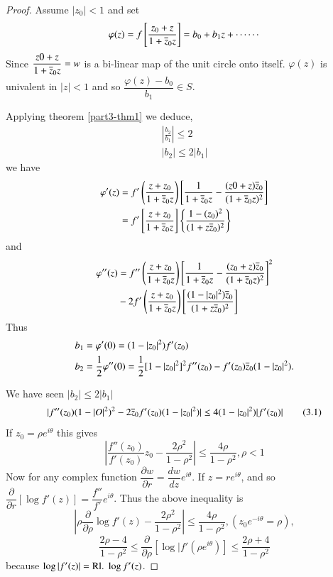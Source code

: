 \begin{proof}
Assume $|z_{0}|<1$ and set
$$
\varphi(z)=f\left[\frac{z_{0}+z}{1+\overline{z}_{0}z}\right]=b_{0}+b_{1}z+\cdots\cdots
$$
Since $\dfrac{z0+z}{1+\overline{z}_{0}z}=w$ is a bi-linear map of the unit
circle onto itself. $\varphi(z)$ is univalent in $|z|<1$ and so
$\dfrac{\varphi(z)-b_{0}}{b_{1}}\in S$.

Applying theorem \ref{part3-thm1} we deduce,
\begin{gather*}
\left|\frac{b_{2}}{b_{1}}\right|\leq 2\\
|b_{2}|\leq 2|b_{1}|
\end{gather*}
we have 
\begin{align*}
\varphi'(z)
&=f'\left(\dfrac{z+z_{0}}{1+\overline{z}_{0}z}\right)\left[\frac{1}{1+\overline{z}_{0}z}-\frac{(z0+z)\overline{z}_{0}}{(1+\overline{z}_{0}z)^{2}}\right]\\
&= f'\left[\frac{z+z_{0}}{1+\overline{z}_{0}z}\right]\left\{\frac{1-(z_{0})^{2}}{(1+z\overline{z}_{0})^{2}}\right\}
\end{align*}
and\pageoriginale
\begin{align*}
\varphi''(z) &=
f''\left(\frac{z+z_{0}}{1+\overline{z}_{0}z}\right)\left[\frac{1}{1+\overline{z}_{0}z}-\frac{(z_{0}+z)\overline{z}_{0}}{(1+\overline{z}_{0}z)^{2}}\right]^{2}\\
&-2f'\left(\frac{z+z_{0}}{1+\overline{z}_{0}z}\right)\left[\frac{(1-|z_{0}|^{2})\overline{z}_{0}}{(1+z\overline{z}_{0})^{2}}\right]
\end{align*}
Thus
\begin{align*}
b_{1} &= \varphi'(0)=(1-|z_{0}|^{2})f'(z_{0})\\
b_{2} &=
\frac{1}{2}\varphi''(0)=\frac{1}{2}[1-|z_{0}|^{2}]^{2}f''(z_{0})-f'(z_{0})\overline{z}_{0}(1-|z_{0}|^{2}). 
\end{align*}

We have seen $|b_{2}|\leq 2 | b_{1}|$ \ie
\begin{equation*}
|f''(z_{0})(1-|O|^{2})^{2}-2\overline{z}_{0}f'(z_{0})(1-|z_{0}|^{2})|\leq
4(1-|z_{0}|^{2})|f'(z_{0})|\tag{3.1}\label{part3-eq3.1} 
\end{equation*}
If $z_{0}=\rho e^{i\theta}$ this gives
$$
\left|\frac{f''(z_{0})}{f'(z_{0})}z_{0}-\frac{2\rho^{2}}{1-\rho^{2}}\right|\leq
\frac{4\rho}{1-\rho^{2}}, \rho<1
$$
Now for any complex function $\dfrac{\partial w}{\partial
  r}=\dfrac{dw}{dz}e^{i\theta}$. If $z=re^{i\theta}$, and so
$\dfrac{\partial}{\partial r}[\log
  f'(z)]=\dfrac{f''}{f'}e^{i\theta}$. Thus the above inequality is 
$$
\left|\rho\frac{\partial}{\partial \rho}\log
f'(z)-\frac{2\rho^{2}}{1-\rho^{2}}\right|\leq
\frac{4\rho}{1-\rho^{2}},(z_{0}e^{-i\theta}=\rho), 
$$
\ie
$$
\frac{2\rho-4}{1-\rho^{2}}\leq \frac{\partial}{\partial \rho}[\log
  |f'(\rho e^{i\theta})]\leq \frac{2\rho+4}{1-\rho^{2}}
$$
because $\log |f'(z)|=\text{Rl.\;} \log f'(z)$.


\end{proof}
